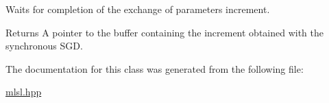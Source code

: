 Waits for completion of the exchange of parameters increment. \begin{DoxyReturn}{Returns}
A pointer to the buffer containing the increment obtained with the synchronous S\-G\-D. 
\end{DoxyReturn}


The documentation for this class was generated from the following file\-:\begin{DoxyCompactItemize}
\item 
\hyperlink{mlsl_8hpp}{mlsl.\-hpp}\end{DoxyCompactItemize}
